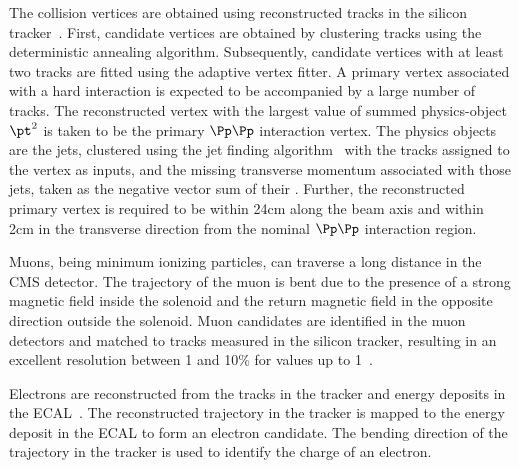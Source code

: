 The collision vertices are obtained using reconstructed tracks in the
silicon tracker~\cite{Chatrchyan:2014fea}. First, candidate vertices
are obtained by clustering tracks using the deterministic annealing
algorithm. Subsequently, candidate vertices with at least two tracks
are fitted using the adaptive vertex fitter. A primary vertex
associated with a hard interaction is expected to be accompanied by a
large number of tracks. The reconstructed vertex with the largest value 
of summed physics-object $\pt^2$ is taken to be the primary $\Pp\Pp$ 
interaction vertex. The physics objects are the jets, clustered using 
the jet finding algorithm~\cite{Cacciari:2008gp,Cacciari:2011ma} with 
the tracks assigned to the vertex as inputs, and the missing transverse
momentum associated with those jets, taken as the negative vector sum
of their \pt. Further,  the reconstructed primary vertex is required to
be within 24\unit{cm} along the beam axis and within 2\unit{cm} in the
transverse direction from the nominal $\Pp\Pp$ interaction region. 

Muons, being minimum ionizing particles, can traverse a long distance
in the CMS detector. The trajectory of the muon is bent due to the
presence of a strong magnetic field inside the solenoid and the return
magnetic field in the opposite direction outside the solenoid. Muon
candidates are identified in the muon detectors and matched to tracks
measured in the silicon tracker, resulting in an excellent \pt
resolution between 1 and 10\% for \pt values up to 1\TeV~\cite{Sirunyan:2018fpa}.

Electrons are reconstructed from the tracks in the tracker and energy
deposits in the ECAL~\cite{Khachatryan:2015hwa}.
The reconstructed trajectory in the tracker is mapped to the energy
deposit in the ECAL to form an electron candidate. The bending
direction of the trajectory in the tracker is used to identify the
charge of an electron.

